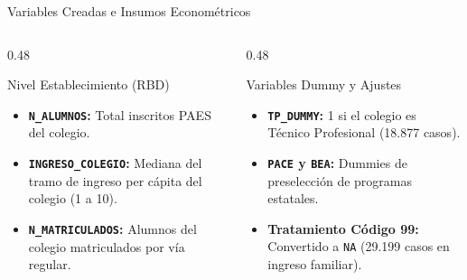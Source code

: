 \documentclass[10pt, aspectratio=169, xcolor=table]{beamer}
\begin{document}
\begin{frame}{Variables Creadas e Insumos Econométricos}
  \begin{columns}[t]
    \begin{column}{0.48\textwidth}
      \begin{block}{Nivel Establecimiento (RBD)}
        \begin{itemize}
          \item \textbf{\texttt{N\_ALUMNOS}:} Total inscritos PAES del colegio.
          \item \textbf{\texttt{INGRESO\_COLEGIO}:} Mediana del tramo de ingreso per cápita del colegio (1 a 10).
          \item \textbf{\texttt{N\_MATRICULADOS}:} Alumnos del colegio matriculados por vía regular.
        \end{itemize}
      \end{block}
    \end{column}

    \begin{column}{0.48\textwidth}
      \begin{exampleblock}{Variables Dummy y Ajustes}
        \begin{itemize}
          \item \textbf{\texttt{TP\_DUMMY}:} 1 si el colegio es Técnico Profesional (18.877 casos).
          \item \textbf{\texttt{PACE} y \texttt{BEA}:} Dummies de preselección de programas estatales.
          \item \textbf{Tratamiento Código 99:} Convertido a \texttt{NA} (29.199 casos en ingreso familiar).
        \end{itemize}
      \end{exampleblock}
    \end{column}
  \end{columns}
\end{frame}
\end{document}
